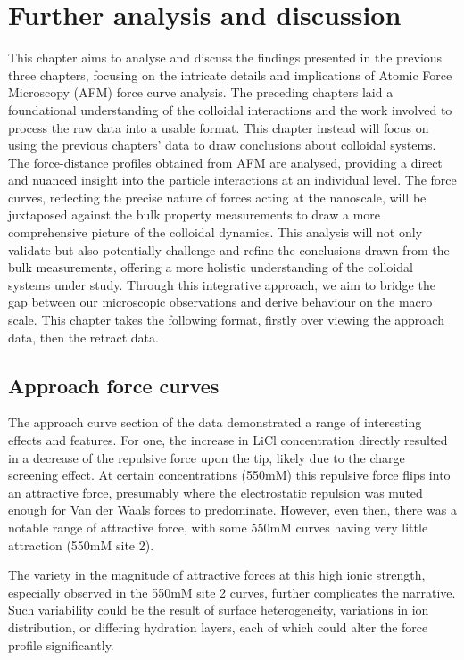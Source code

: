 \chapter{Further analysis and discussion}

This chapter aims to analyse and discuss the findings presented in the previous three chapters, focusing on the intricate details and implications of Atomic Force Microscopy (AFM) force curve analysis. The preceding chapters laid a foundational understanding of the colloidal interactions and the work involved to process the raw data into a usable format. This chapter instead will focus on using the previous chapters' data to draw conclusions about colloidal systems. The force-distance profiles obtained from AFM are analysed, providing a direct and nuanced insight into the particle interactions at an individual level. The force curves, reflecting the precise nature of forces acting at the nanoscale, will be juxtaposed against the bulk property measurements to draw a more comprehensive picture of the colloidal dynamics. This analysis will not only validate but also potentially challenge and refine the conclusions drawn from the bulk measurements, offering a more holistic understanding of the colloidal systems under study. Through this integrative approach, we aim to bridge the gap between our microscopic observations and derive behaviour on the macro scale. This chapter takes the following format, firstly over viewing the approach data, then the retract data.

\section{Approach force curves}

The approach curve section of the data demonstrated a range of interesting effects and features. For one, the increase in LiCl concentration directly resulted in a decrease of the repulsive force upon the tip, likely due to the charge screening effect. At certain concentrations (550mM) this repulsive force flips into an attractive force, presumably where the electrostatic repulsion was muted enough for Van der Waals forces to predominate. However, even then, there was a notable range of attractive force, with some 550mM curves having very little attraction (550mM site 2). 

The variety in the magnitude of attractive forces at this high ionic strength, especially observed in the 550mM site 2 curves, further complicates the narrative. Such variability could be the result of surface heterogeneity, variations in ion distribution, or differing hydration layers, each of which could alter the force profile significantly.

